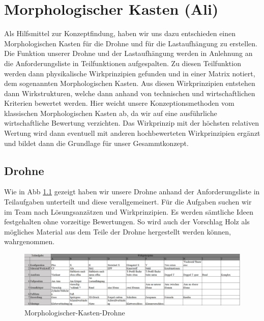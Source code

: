 \chapter{Morphologischer Kasten (Ali)}
Als Hilfsmittel zur Konzeptfindung, haben wir uns dazu entschieden einen Morphologischen Kasten für die Drohne und für die Lastaufhängung zu erstellen.
Die Funktion unserer Drohne und der Lastaufhängung werden in Anlehnung an die Anforderungsliste in Teilfunktionen aufgespalten. Zu diesen Teilfunktion werden dann physikalische Wirkprinzipien gefunden und in einer Matrix notiert, dem sogenannten Morphologischen Kasten. Aus diesen Wirkprinzipien entstehen dann Wirkstrukturen, welche dann anhand von technischen und wirtschaftlichen Kriterien bewertet werden. Hier weicht unsere Konzeptionsmethoden vom klassischen Morphologischen Kasten ab, da wir auf eine ausführliche wirtschaftliche Bewertung verzichten. Das Wirkprinzip mit der höchsten relativen Wertung wird dann eventuell mit anderen hochbewerteten Wirkprinzipien ergänzt und bildet dann die Grundlage für unser Gesammtkonzept. 

\section{Drohne}
Wie in Abb \ref{fig:Morphologischer-Kasten-Drohne} gezeigt haben wir unsere Drohne anhand der Anforderungsliste in Teilaufgaben unterteilt und diese verallgemeinert. Für die Aufgaben suchen wir im Team nach Lösungsanzätzen und Wirkprinzipien. Es werden sämtliche Ideen festgehalten ohne vorzeitige Bewertungen.
So wird auch der Vorschlag Holz als mögliches Material aus dem Teile der Drohne hergestellt werden können, wahrgenommen.

\begin{figure}[h]
	\centering
	\includegraphics[width=1.00\textwidth]
	{bilder/Morphologischer_Kasten/MorphKastDrohne}
	\caption{Morphologischer-Kasten-Drohne}
	\label{fig:Morphologischer-Kasten-Drohne}
\end{figure}

